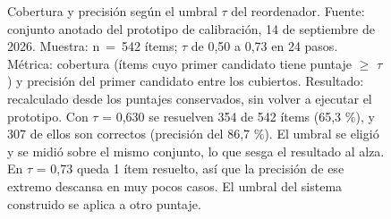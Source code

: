 \begin{figure}[!htbp]
\centering
{}\tablaG
{}
\caption[{Cobertura y precisión según el umbral $\tau$ del reordenador}]{Cobertura y precisión según el umbral $\tau$ del reordenador. Fuente:\allowbreak{} conjunto anotado del prototipo de calibración, 14 de septiembre de 2026. Muestra:\allowbreak{} n~=~542 ítems; $\tau$ de 0,50 a 0,73 en 24 pasos. Métrica:\allowbreak{} cobertura (ítems cuyo primer candidato tiene puntaje $\geq$ $\tau$) y precisión del primer candidato entre los cubiertos. Resultado:\allowbreak{} recalculado desde los puntajes conservados, sin volver a ejecutar el prototipo. Con $\tau$ = 0,630 se resuelven 354 de 542 ítems (65,3 \%), y 307 de ellos son correctos (precisión del 86,7 \%). El umbral se eligió y se midió sobre el mismo conjunto, lo que sesga el resultado al alza. En $\tau$ = 0,73 queda 1 ítem resuelto, así que la precisión de ese extremo descansa en muy pocos casos. El umbral del sistema construido se aplica a otro puntaje.}
\label{fig:bench-F5-2}
\end{figure}
